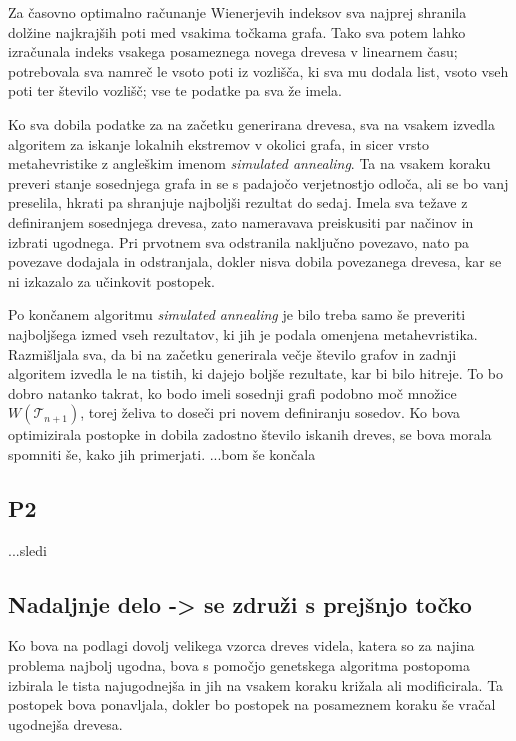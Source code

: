 \documentclass[a4paper, 12 pt]{article}
\begin{document}
Za časovno optimalno računanje Wienerjevih indeksov sva najprej shranila dolžine najkrajših poti med vsakima točkama grafa. Tako sva potem lahko izračunala indeks vsakega posameznega novega drevesa v linearnem času; potrebovala sva namreč le vsoto poti iz vozlišča, ki sva mu dodala list, vsoto vseh poti ter število vozlišč; vse te podatke pa sva že imela. \newline

 Ko sva dobila podatke za na začetku generirana drevesa, sva na vsakem izvedla algoritem za iskanje lokalnih ekstremov v okolici grafa, in sicer vrsto metahevristike z angleškim imenom \textit{simulated annealing}. Ta na vsakem koraku preveri stanje sosednjega grafa in se s padajočo verjetnostjo odloča, ali se bo vanj preselila, hkrati pa shranjuje najboljši rezultat do sedaj. Imela sva težave z definiranjem sosednjega drevesa, zato nameravava preiskusiti par načinov in izbrati ugodnega. Pri prvotnem sva odstranila naključno povezavo, nato pa povezave dodajala in odstranjala, dokler nisva dobila povezanega drevesa, kar se ni izkazalo za učinkovit postopek. \newline

Po končanem algoritmu \textit{simulated annealing} je bilo treba samo še preveriti najboljšega izmed vseh rezultatov, ki jih je podala omenjena metahevristika. Razmišljala sva, da bi na začetku generirala večje število grafov in zadnji algoritem izvedla le na tistih, ki dajejo boljše rezultate, kar bi bilo hitreje. To bo dobro natanko takrat, ko bodo imeli sosednji grafi podobno moč množice $W(\mathscr{T}_{n+1})$, torej želiva to doseči pri novem definiranju sosedov. Ko bova optimizirala postopke in dobila zadostno število iskanih dreves, se bova morala spomniti še, kako jih primerjati.
...bom še končala


\subsection{P2}
...sledi


\subsection{Nadaljnje delo -> se združi s prejšnjo točko}

Ko bova na podlagi dovolj velikega vzorca dreves videla, katera so za najina problema najbolj ugodna, bova s pomočjo genetskega algoritma postopoma izbirala le tista najugodnejša in jih na vsakem koraku križala ali modificirala. Ta postopek bova ponavljala, dokler bo postopek na posameznem koraku še vračal ugodnejša drevesa.
\end{document}
